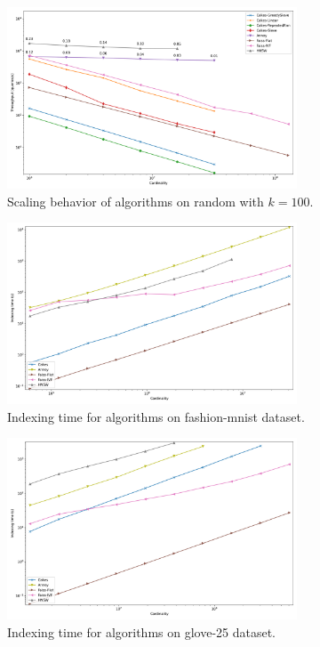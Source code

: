 \documentclass{article}
\begin{document}
\begin{figure}[ht!]
    \centering
    \includegraphics[width=3.4in]{plots/random-1000000-128-knn-100.png}
    \caption{
        Scaling behavior of algorithms on random with $k=100$. 
    }
    \label{fig:supplement:random-k-100}
\end{figure}

\begin{figure}[ht!]
    \centering
    \includegraphics[width=3.4in]{plots/fashion-mnist-indexing.png}
    \caption{
        Indexing time for algorithms on fashion-mnist dataset. 
    }
    \label{fig:supplement:fashion-mnist-indexing}
\end{figure}

\begin{figure}[ht!]
    \centering
    \includegraphics[width=3.4in]{plots/glove-25-indexing.png}
    \caption{
        Indexing time for algorithms on glove-25 dataset. 
    }
    \label{fig:supplement:glove-25-indexing}
\end{figure}
\end{document}
